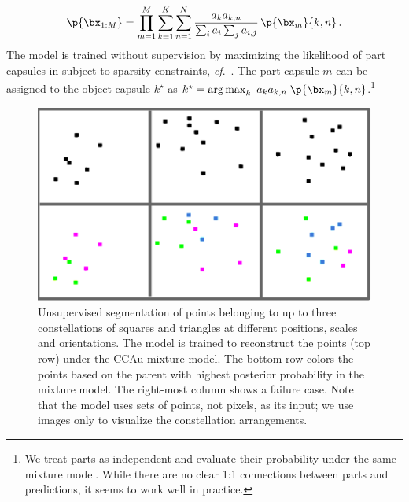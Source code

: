 \vspace*{-1.2em}
\begin{equation}
    \p{\bx_{1:M}} = \prod_{m=1}^M \sum_{k=1}^K \sum_{n=1}^{N}  
    \frac{a_k a_{k,n}}{\sum_i a_i \sum_j a_{i,j}}
    \,\p{\bx_m}{k,n}\,. \label{eq:constellation_likelihood}
\end{equation}
The model is trained without supervision by maximizing the likelihood of part capsules in  subject to sparsity constraints, \textit{cf}.\ .
The part capsule $m$ can be assigned to the object capsule $k^\star$ as $k^\star = \operatorname{arg\,max}_{k}~a_k a_{k,n}\;\p{\bx_m}{k,n}$.\footnote{We treat parts as independent and evaluate their probability under the same mixture model. While there are no clear 1:1 connections between parts and predictions, it seems to work well in practice.}
\begin{figure} 
    \centering
    \begin{minipage}[c]{0.35\linewidth}
        \centering
        \includegraphics[width=\linewidth]{figures/SCA/consinvert5}
    \end{minipage}
    \hfill
    \begin{minipage}[c]{0.63\linewidth}
        \centering
        \caption{
            Unsupervised segmentation of points belonging to up to three constellations of squares and triangles at different positions, scales and orientations. 
            The model is trained to reconstruct the points (top row) under the \gls{CCAu} mixture model. The bottom row colors the points based on the parent with highest posterior probability in the mixture model. 
            The right-most column shows a failure case.
            Note that the model uses sets of points, not pixels, as its input; we use images  only to visualize the constellation arrangements.
        }
        \label{fig:constellations}
    \end{minipage}
    \vspace*{-.75em}
\end{figure}
